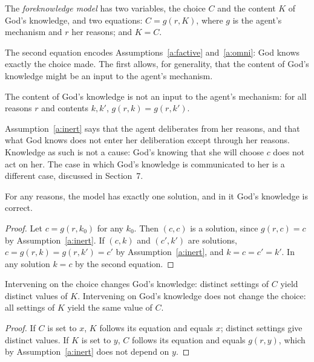 \documentclass{situationist-preprint}
\begin{document}
\begin{definition}\label{d:model}
The \emph{foreknowledge model} has two variables, the choice $C$ and the content $K$ of God's knowledge, and two equations: $C = g(r, K)$, where $g$ is the agent's mechanism and $r$ her reasons; and $K = C$.
\end{definition}

The second equation encodes Assumptions~\ref{a:factive} and~\ref{a:omni}: God knows exactly the choice made. The first allows, for generality, that the content of God's knowledge might be an input to the agent's mechanism.

\begin{assumption}\label{a:inert}
The content of God's knowledge is not an input to the agent's mechanism: for all reasons $r$ and contents $k, k'$, $g(r,k) = g(r,k')$.
\end{assumption}

Assumption~\ref{a:inert} says that the agent deliberates from her reasons, and that what God knows does not enter her deliberation except through her reasons. Knowledge as such is not a cause: God's knowing that she will choose $c$ does not act on her. The case in which God's knowledge is communicated to her is a different case, discussed in Section~7.

\begin{proposition}\label{p:solution}
For any reasons, the model has exactly one solution, and in it God's knowledge is correct.
\end{proposition}

\begin{proof}
Let $c = g(r, k_0)$ for any $k_0$. Then $(c, c)$ is a solution, since $g(r, c) = c$ by Assumption~\ref{a:inert}. If $(c, k)$ and $(c', k')$ are solutions, $c = g(r,k) = g(r,k') = c'$ by Assumption~\ref{a:inert}, and $k = c = c' = k'$. In any solution $k = c$ by the second equation.
\end{proof}

\begin{theorem}\label{t:asym}
Intervening on the choice changes God's knowledge: distinct settings of $C$ yield distinct values of $K$. Intervening on God's knowledge does not change the choice: all settings of $K$ yield the same value of $C$.
\end{theorem}

\begin{proof}
If $C$ is set to $x$, $K$ follows its equation and equals $x$; distinct settings give distinct values. If $K$ is set to $y$, $C$ follows its equation and equals $g(r, y)$, which by Assumption~\ref{a:inert} does not depend on $y$.
\end{proof}
\end{document}
